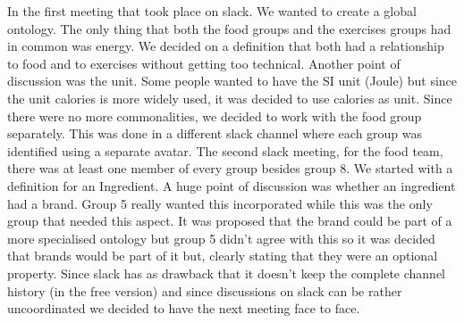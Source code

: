 In the first meeting that took place on slack. We wanted to create a global ontology. The only thing that both the food groups and the exercises groups had in common was energy. We decided on a definition that both had a relationship to food and to exercises without getting too technical. Another point of discussion was the unit. Some people wanted to have the SI unit (Joule) but since the unit calories is more widely used, it was decided to use calories as unit. Since there were no more commonalities, we decided to work with the food group separately. This was done in a different slack channel where each group was identified using a separate avatar. 
\newline
\newline
\noindent
The second slack meeting, for the food team, there was at least one member of every group besides group 8. We started with a definition for an Ingredient. A huge point of discussion was whether an ingredient had a brand. Group 5 really wanted this incorporated while this was the only group that needed this aspect. It was proposed that the brand could be part of a more specialised ontology but group 5 didn't agree with this so it was decided that brands would be part of it but, clearly stating that they were an optional property. Since slack has as drawback that it doesn't keep the complete channel history (in the free version) and since discussions on slack can be rather uncoordinated we decided to have the next meeting face to face. 
\newline
\newline
\noindent
